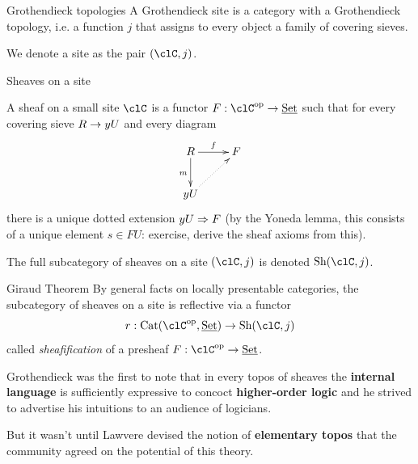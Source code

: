 \documentclass[presentation,handout]{beamer}
\begin{document}
%
%
%
%
%
%
%
\begin{frame}{Grothendieck topologies}
  \onslide<+->
  A \alert{Grothendieck site} is a category with a Grothendieck topology, i.e. a function $j$ that assigns to every object a family of covering sieves.
  
  \onslide<+->
  We denote a site as the pair $(\clC,j)$.
\end{frame}
%
%
%
%
%
%
%
\begin{frame}{Sheaves on a site}
  \begin{block}{}
    A \alert{sheaf} on a small site $\clC$ is a functor $F : \clC^\op\to\Set$ such that for every covering sieve $R \to y U$ and every diagram
    \[\xymatrix{
    R \ar[r]^f\ar[d]_m & F \\
    \yo U\ar@{.>}[ur]
    }\]
    there is a unique dotted extension $y U \Rightarrow F$ 
    (by the Yoneda lemma, this consists of a unique element $s\in FU$: exercise, derive the sheaf axioms from this).
    
    The full subcategory of sheaves on a site $(\clC,j)$ is denoted $\text{Sh}(\clC,j)$.
  \end{block}
\end{frame}
%
%
%
%
%
%
%
\begin{frame}{Giraud Theorem}
  By general facts on locally presentable categories, the subcategory of sheaves on a site is reflective via a functor
  \[
  r : \text{Cat}(\clC^\op,\Set) \to \text{Sh}(\clC,j)
  \] called \emph{sheafification} of a presheaf $F : \clC^\op\to \Set$.
  
  \begin{myblock}{}%
    \scriptsize
    Grothendieck was the first to note that in every topos of sheaves the \textbf{internal language} is sufficiently expressive to concoct \textbf{higher-order logic} and he strived to advertise his intuitions to an audience of logicians.
    
    But it wasn't until Lawvere devised the notion of \textbf{elementary topos} that the community agreed on the potential of this theory.
  \end{myblock}
\end{frame}
\end{document}
